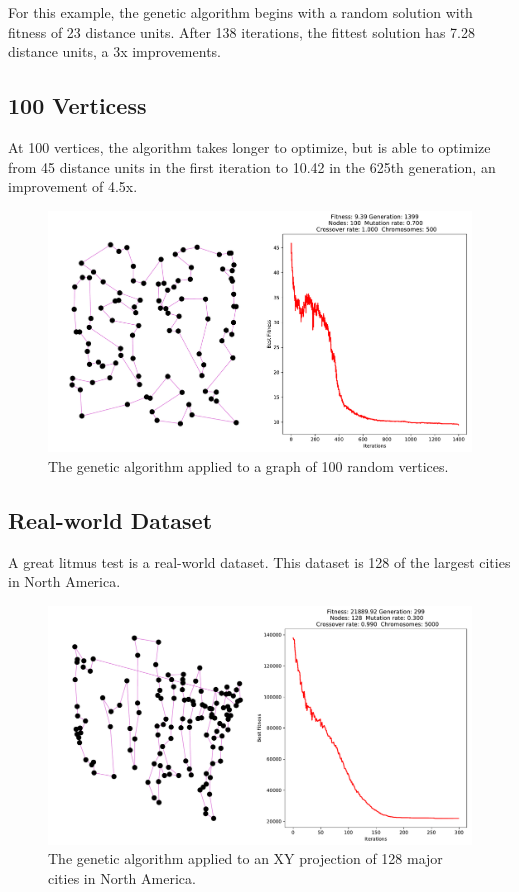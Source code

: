 For this example, the genetic algorithm begins with a random solution with fitness of 23 distance units. After 138 iterations, the fittest solution has 7.28 distance units, a 3x improvements.

\subsection{100 Verticess}

At 100 vertices, the algorithm takes longer to optimize, but is able to optimize from 45 distance units in the first iteration to 10.42 in the 625th generation, an improvement of 4.5x.

\begin{figure}[H]
\centering
\includegraphics[width=6in]{images/100.pdf}
\caption{The genetic algorithm applied to a graph of 100 random vertices.}
\label{fig:somthing}
\end{figure}

\subsection{Real-world Dataset}

A great litmus test is a real-world dataset. This dataset is 128 of the largest cities in North America.

\begin{figure}[H]
\centering
\includegraphics[width=6in]{images/north_america.pdf}
\caption{The genetic algorithm applied to an XY projection of 128 major cities in North America.}
\label{fig:somthing}
\end{figure}